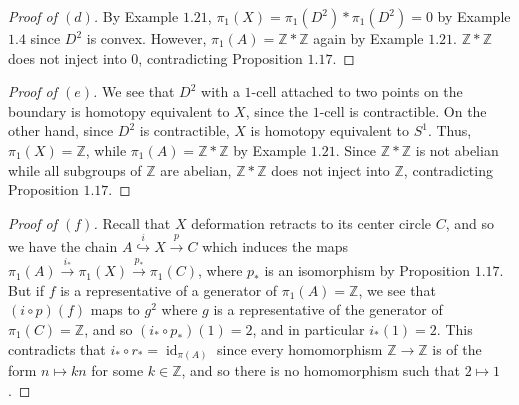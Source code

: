 \documentclass[12pt]{article}
\theoremstyle{remark}
\DeclareMathOperator{\id}{id}
\begin{document}
\begin{proof}[Proof of $(d)$]
  By Example $1.21$, $\pi_1(X) = \pi_1(D^2) \ast \pi_1(D^2) = 0$ by Example $1.4$ since $D^2$ is convex. However, $\pi_1(A) = \mathbb{Z} \ast \mathbb{Z}$ again by Example $1.21$. $\mathbb{Z} \ast \mathbb{Z}$ does not inject into $0$, contradicting Proposition $1.17$.
\end{proof}
\begin{proof}[Proof of $(e)$]
  We see that $D^2$ with a $1$-cell attached to two points on the boundary is homotopy equivalent to $X$, since the $1$-cell is contractible. On the other hand, since $D^2$ is contractible, $X$ is homotopy equivalent to $S^1$. Thus, $\pi_1(X) = \mathbb{Z}$, while $\pi_1(A) = \mathbb{Z} \ast \mathbb{Z}$ by Example $1.21$. Since $\mathbb{Z} \ast \mathbb{Z}$ is not abelian while all subgroups of $\mathbb{Z}$ are abelian, $\mathbb{Z} \ast \mathbb{Z}$ does not inject into $\mathbb{Z}$, contradicting Proposition $1.17$.
\end{proof}
\begin{proof}[Proof of $(f)$]
  Recall that $X$ deformation retracts to its center circle $C$, and so we have the chain $A \overset{i}{\hookrightarrow} X \overset{p}{\to} C$ which induces the maps $\pi_1(A) \overset{i_*}{\to} \pi_1(X) \overset{p_*}{\to} \pi_1(C)$, where $p_*$ is an isomorphism by Proposition $1.17$. But if $f$ is a representative of a generator of $\pi_1(A) = \mathbb{Z}$, we see that $(i \circ p)(f)$ maps to $g^2$ where $g$ is a representative of the generator of $\pi_1(C) = \mathbb{Z}$, and so $(i_* \circ p_*)(1) = 2$, and in particular $i_*(1) = 2$. This contradicts that $i_* \circ r_* = \id_{\pi(A)}$ since every homomorphism $\mathbb{Z} \to \mathbb{Z}$ is of the form $n \mapsto kn$ for some $k \in \mathbb{Z}$, and so there is no homomorphism such that $2 \mapsto 1$.
\end{proof}
\end{document}
